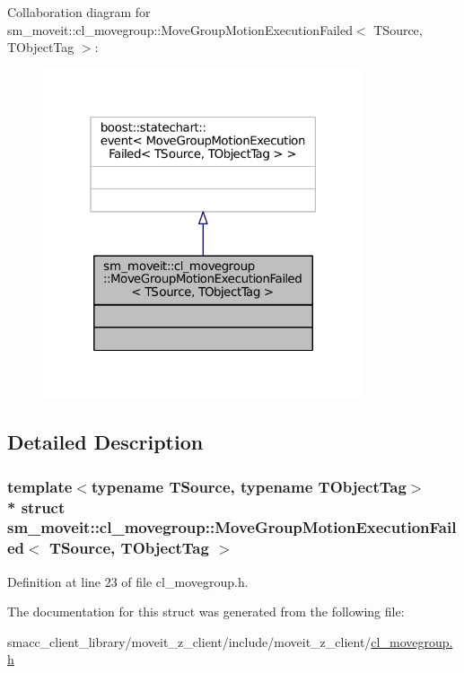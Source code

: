 Collaboration diagram for sm\+\_\+moveit\+:\+:cl\+\_\+movegroup\+:\+:Move\+Group\+Motion\+Execution\+Failed$<$ T\+Source, T\+Object\+Tag $>$\+:
\nopagebreak
\begin{figure}[H]
\begin{center}
\leavevmode
\includegraphics[width=268pt]{structsm__moveit_1_1cl__movegroup_1_1MoveGroupMotionExecutionFailed__coll__graph}
\end{center}
\end{figure}


\subsection{Detailed Description}
\subsubsection*{template$<$typename T\+Source, typename T\+Object\+Tag$>$\\*
struct sm\+\_\+moveit\+::cl\+\_\+movegroup\+::\+Move\+Group\+Motion\+Execution\+Failed$<$ T\+Source, T\+Object\+Tag $>$}



Definition at line 23 of file cl\+\_\+movegroup.\+h.



The documentation for this struct was generated from the following file\+:\begin{DoxyCompactItemize}
\item 
smacc\+\_\+client\+\_\+library/moveit\+\_\+z\+\_\+client/include/moveit\+\_\+z\+\_\+client/\hyperlink{cl__movegroup_8h}{cl\+\_\+movegroup.\+h}\end{DoxyCompactItemize}
